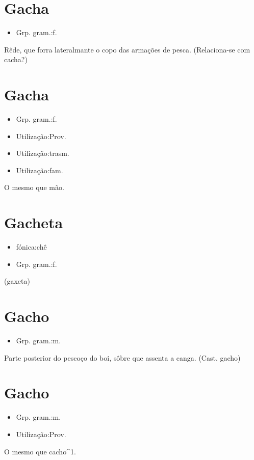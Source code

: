 \section{Gacha}
\begin{itemize}
\item {Grp. gram.:f.}
\end{itemize}
Rêde, que forra lateralmante o copo das armações de pesca.
(Relaciona-se com \textunderscore cacha\textunderscore ?)
\section{Gacha}
\begin{itemize}
\item {Grp. gram.:f.}
\end{itemize}
\begin{itemize}
\item {Utilização:Prov.}
\end{itemize}
\begin{itemize}
\item {Utilização:trasm.}
\end{itemize}
\begin{itemize}
\item {Utilização:fam.}
\end{itemize}
O mesmo que \textunderscore mão\textunderscore .
\section{Gacheta}
\begin{itemize}
\item {fónica:chê}
\end{itemize}
\begin{itemize}
\item {Grp. gram.:f.}
\end{itemize}
(\textunderscore gaxeta\textunderscore )
\section{Gacho}
\begin{itemize}
\item {Grp. gram.:m.}
\end{itemize}
Parte posterior do pescoço do boi, sôbre que assenta a canga.
(Cast. \textunderscore gacho\textunderscore )
\section{Gacho}
\begin{itemize}
\item {Grp. gram.:m.}
\end{itemize}
\begin{itemize}
\item {Utilização:Prov.}
\end{itemize}
O mesmo que \textunderscore cacho\textunderscore ^1.

